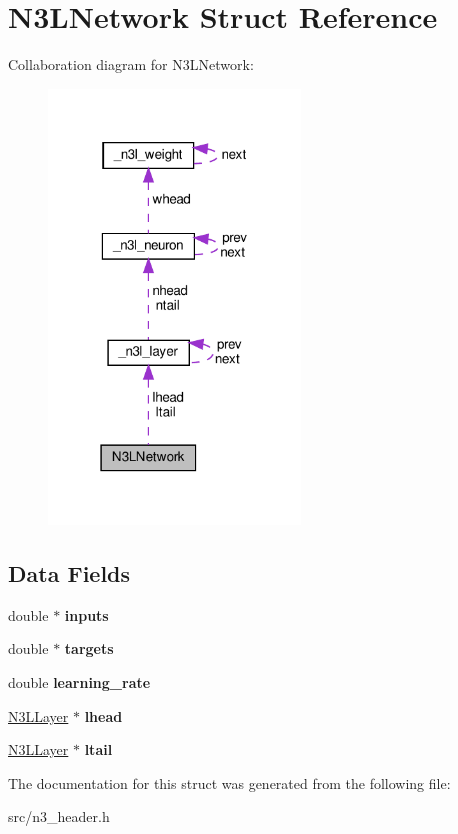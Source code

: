 \hypertarget{structN3LNetwork}{}\section{N3\+L\+Network Struct Reference}
\label{structN3LNetwork}


Collaboration diagram for N3\+L\+Network\+:\nopagebreak
\begin{figure}[H]
\begin{center}
\leavevmode
\includegraphics[width=190pt]{structN3LNetwork__coll__graph}
\end{center}
\end{figure}
\subsection*{Data Fields}
\begin{DoxyCompactItemize}
\item 
\mbox{\label{structN3LNetwork_a45ff5bcae18502559925aba0cbd0313b}} 
double $\ast$ {\bfseries inputs}
\item 
\mbox{\label{structN3LNetwork_aba0f6767a66173743840b7c9fa919daf}} 
double $\ast$ {\bfseries targets}
\item 
\mbox{\label{structN3LNetwork_ae7c5e2ed74786685185cf2cbb955bf51}} 
double {\bfseries learning\+\_\+rate}
\item 
\mbox{\label{structN3LNetwork_ae77d4b7deecdc3c9590a4112689db2f8}} 
\hyperlink{struct__n3l__layer}{N3\+L\+Layer} $\ast$ {\bfseries lhead}
\item 
\mbox{\label{structN3LNetwork_a758fd06b3dda29e064ccd4bc4d27e1c3}} 
\hyperlink{struct__n3l__layer}{N3\+L\+Layer} $\ast$ {\bfseries ltail}
\end{DoxyCompactItemize}


The documentation for this struct was generated from the following file\+:\begin{DoxyCompactItemize}
\item 
src/n3\+\_\+header.\+h\end{DoxyCompactItemize}
